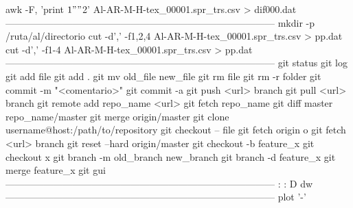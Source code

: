 awk -F, '{print $1 " " $2}' Al-AR-M-H-tex_00001.spr_trs.csv > dif000.dat
------------------------------------------------------------------------------------
mkdir -p /ruta/al/directorio
cut -d',' -f1,2,4 Al-AR-M-H-tex_00001.spr_trs.csv > pp.dat
cut -d',' -f1-4 Al-AR-M-H-tex_00001.spr_trs.csv > pp.dat
------------------------------------------------------------------------------------
git status
git log
git add file
git add .
git mv old_file new_file
git rm file
git rm -r folder
git commit -m "<comentario>"
git commit -a
git push <url> branch
git pull <url> branch
git remote add repo_name <url>
git fetch repo_name
git diff master repo_name/master
git merge origin/master
git clone username@host:/path/to/repository
git checkout -- file
git fetch origin o git fetch <url> branch
git reset --hard origin/master
git checkout -b feature_x
git checkout x
git branch -m old_branch new_branch
git branch -d feature_x
git merge feature_x
git gui
------------------------------------------------------------------------------------
:%
:%
D
dw
------------------------------------------------------------------------------------
plot '-'
